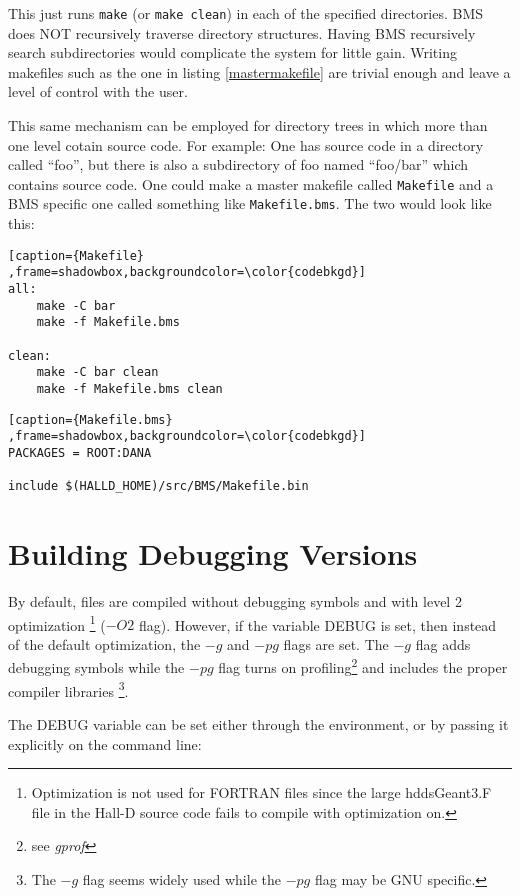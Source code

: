 \documentclass[12pt]{article}
\begin{document}
This just runs {\lstinline !make!} (or {\lstinline !make clean!})
in each of the specified directories. BMS does NOT recursively
traverse directory structures. Having BMS recursively search
subdirectories would complicate the system for little gain. Writing
makefiles such as the one in listing \ref{mastermakefile} are
trivial enough and leave a level of control with the user.

This same mechanism can be employed for directory trees in which
more than one level cotain source code. For example: One has 
source code in a directory called ``foo'', but there is also
a subdirectory of foo named ``foo/bar'' which contains source
code. One could make a master makefile called {\lstinline !Makefile!}
and a BMS specific one called something like {\lstinline !Makefile.bms!}.
The two would look like this:

\begin{lstlisting}[caption={Makefile}
,frame=shadowbox,backgroundcolor=\color{codebkgd}]
all:
	make -C bar
	make -f Makefile.bms

clean:
	make -C bar clean
	make -f Makefile.bms clean
\end{lstlisting}

\begin{lstlisting}[caption={Makefile.bms}
,frame=shadowbox,backgroundcolor=\color{codebkgd}]
PACKAGES = ROOT:DANA

include $(HALLD_HOME)/src/BMS/Makefile.bin
\end{lstlisting}

\section{Building Debugging Versions}
\label{debug}
By default, files are compiled without debugging symbols and with
level 2 optimization \footnote{Optimization is not used
for FORTRAN files since the large hddsGeant3.F file in the Hall-D source
code fails to compile with optimization on.} ($-O2$ flag).
However, if the variable DEBUG is set,
then instead of the default optimization, the $-g$ and $-pg$ 
flags are set. The $-g$ flag adds debugging symbols while the
$-pg$ flag turns on profiling\footnote{see {\it gprof}} and
includes the proper compiler libraries \footnote{The $-g$ flag
seems widely used while the $-pg$ flag may be GNU specific.}.

The DEBUG variable can be set either through the environment,
or by passing it explicitly on the command line:
\end{document}
